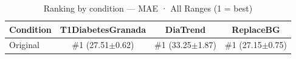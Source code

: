 \begin{table}[htbp]
\centering
\small
\caption{Ranking by condition — MAE · All Ranges  (1 = best)}
\label{tab:ranking_mae_entire_family_size_baseline}
\begin{tabular}{lccc}
\toprule
\textbf{Condition} & \textbf{T1DiabetesGranada} & \textbf{DiaTrend} & \textbf{ReplaceBG} \\
\midrule
Original & \#1 (27.51$\pm$0.62) & \#1 (33.25$\pm$1.87) & \#1 (27.15$\pm$0.75) \\
\bottomrule
\end{tabular}
\end{table}